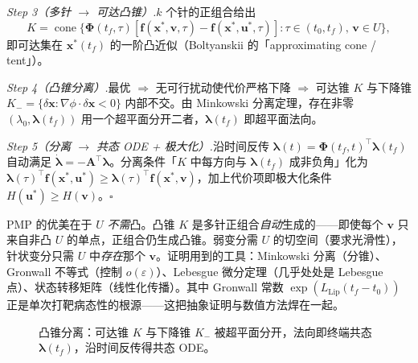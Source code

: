\emph{Step 3（多针 $\to$ 可达凸锥）.}\;$k$ 个针的正组合给出
\begin{equation}
  K=\operatorname{cone}\big\{\boldsymbol\Phi(t_f,\tau)[\mathbf f(\mathbf x^\ast,\mathbf v,\tau)-\mathbf f(\mathbf x^\ast,\mathbf u^\ast,\tau)]:\tau\in(t_0,t_f),\,\mathbf v\in U\big\},
  \label{eq:pmp-cone}
\end{equation}
即可达集在 $\mathbf x^\ast(t_f)$ 的一阶凸近似（Boltyanskii 的「approximating cone / tent」）。

\emph{Step 4（凸锥分离）.}\;最优 $\Rightarrow$ 无可行扰动使代价严格下降 $\Rightarrow$ 可达锥 $K$ 与下降锥 $K_-=\{\delta\mathbf x:\nabla\phi\cdot\delta\mathbf x<0\}$ 内部不交。由 Minkowski 分离定理，存在非零 $(\lambda_0,\boldsymbol\lambda(t_f))$ 用一个超平面分开二者，$\boldsymbol\lambda(t_f)$ 即超平面法向。

\emph{Step 5（分离 $\to$ 共态 ODE + 极大化）.}\;沿时间反传 $\boldsymbol\lambda(t)=\boldsymbol\Phi(t_f,t)^\top\boldsymbol\lambda(t_f)$ 自动满足 $\dot{\boldsymbol\lambda}=-\mathbf A^\top\boldsymbol\lambda$。分离条件「$K$ 中每方向与 $\boldsymbol\lambda(t_f)$ 成非负角」化为 $\boldsymbol\lambda(\tau)^\top\mathbf f(\mathbf x^\ast,\mathbf u^\ast)\ge\boldsymbol\lambda(\tau)^\top\mathbf f(\mathbf x^\ast,\mathbf v)$，加上代价项即极大化条件 $H(\mathbf u^\ast)\ge H(\mathbf v)$。\hfill$\square$

\begin{insight}[针状变分为何不需 $U$ 凸]
PMP 的优美在于 $U$ \emph{不需}凸。凸锥 $K$ 是多针正组合\emph{自动}生成的——即使每个 $\mathbf v$ 只来自非凸 $U$ 的单点，正组合仍生成凸锥。弱变分需 $U$ 的切空间（要求光滑性），针状变分只需 $U$ 中\emph{存在}那个 $\mathbf v$。证明用到的工具：Minkowski 分离（分锥）、Gronwall 不等式（控制 $o(\varepsilon)$）、Lebesgue 微分定理（几乎处处是 Lebesgue 点）、状态转移矩阵（线性化传播）。其中 Gronwall 常数 $\exp(L_{\mathrm{Lip}}(t_f-t_0))$ 正是单次打靶病态性的根源——这把抽象证明与数值方法焊在一起。
\end{insight}

\begin{figure}[ht]
\centering
{}
\caption{凸锥分离：可达锥 $K$ 与下降锥 $K_-$ 被超平面分开，法向即终端共态 $\boldsymbol\lambda(t_f)$，沿时间反传得共态 ODE。}
\label{fig:pmp-cone}
\end{figure}

